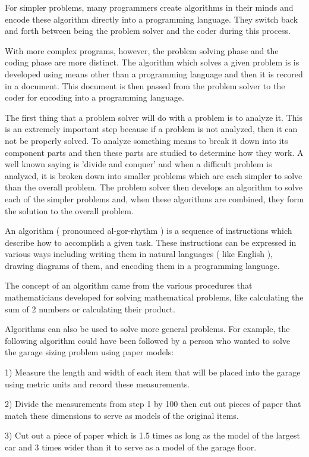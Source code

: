 \documentclass[12pt,oneside]{book}
\begin{document}
For simpler problems, many programmers create algorithms in their minds and encode these algorithm directly into a programming language. They switch back and forth between being the problem solver and the coder during this process. 

With more complex programs, however, the problem solving phase and the coding phase are more distinct. The algorithm which solves a given problem is is developed using means other than a programming language and then it is recored in a document. This document is then passed from the problem solver to the coder for encoding into a programming language. 

The first thing that a problem solver will do with a problem is to analyze it. This is an extremely important step because if a problem is not analyzed, then it can not be properly solved. To analyze something means to break it down into its component parts and then these parts are studied to determine how they work. A well known saying is 'divide and conquer' and when a difficult problem is analyzed, it is broken down into smaller problems which are each simpler to solve than the overall problem. The problem solver then develops an algorithm to solve each of the simpler problems and, when these algorithms are combined, they form the solution to the overall problem. 

An algorithm ( pronounced al{}-gor{}-rhythm ) is a sequence of instructions which describe how to accomplish a given task. These instructions can be expressed in various ways including writing them in natural languages ( like English ), drawing diagrams of them, and encoding them in a programming language. 

The concept of an algorithm came from the various procedures that mathematicians developed for solving mathematical problems, like calculating the sum of 2 numbers or calculating their product. 

Algorithms can also be used to solve more general problems. For example, the following algorithm could have been followed by a person who wanted to solve the garage sizing problem using paper models: 

1) Measure the length and width of each item that will be placed into the garage using metric units and record these measurements. 


2) Divide the measurements from step 1 by 100 then cut out pieces of paper that match these dimensions to serve as models of the original items. 

3) Cut out a piece of paper which is 1.5 times as long as the model of the largest car and 3 times wider than it to serve as a model of the garage floor. 
\end{document}
